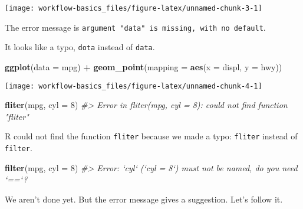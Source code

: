 \documentclass[]{book}
\newenvironment{Shaded}{\begin{snugshade}}{\end{snugshade}}
\newcommand{\CommentTok}[1]{\textcolor[rgb]{0.56,0.35,0.01}{\textit{#1}}}
\newcommand{\DataTypeTok}[1]{\textcolor[rgb]{0.13,0.29,0.53}{#1}}
\newcommand{\DecValTok}[1]{\textcolor[rgb]{0.00,0.00,0.81}{#1}}
\newcommand{\KeywordTok}[1]{\textcolor[rgb]{0.13,0.29,0.53}{\textbf{#1}}}
\newcommand{\NormalTok}[1]{#1}
\newcommand{\OperatorTok}[1]{\textcolor[rgb]{0.81,0.36,0.00}{\textbf{#1}}}
\newcommand{\StringTok}[1]{\textcolor[rgb]{0.31,0.60,0.02}{#1}}
\theoremstyle{plain}
\theoremstyle{remark}
\theoremstyle{definition}
\theoremstyle{definition}
\theoremstyle{definition}
\theoremstyle{remark}
\begin{document}
\begin{center}\texttt{[image: workflow-basics\_files/figure-latex/unnamed-chunk-3-1]} \end{center}

The error message is
\texttt{argument\ "data"\ is\ missing,\ with\ no\ default}.

It looks like a typo, \texttt{dota} instead of \texttt{data}.

\begin{Shaded}
\begin{Highlighting}[]
\KeywordTok{ggplot}\NormalTok{(}\DataTypeTok{data =}\NormalTok{ mpg) }\OperatorTok{+}
\StringTok{  }\KeywordTok{geom_point}\NormalTok{(}\DataTypeTok{mapping =} \KeywordTok{aes}\NormalTok{(}\DataTypeTok{x =}\NormalTok{ displ, }\DataTypeTok{y =}\NormalTok{ hwy))}
\end{Highlighting}
\end{Shaded}

\begin{center}\texttt{[image: workflow-basics\_files/figure-latex/unnamed-chunk-4-1]} \end{center}

\begin{Shaded}
\begin{Highlighting}[]
\KeywordTok{fliter}\NormalTok{(mpg, }\DataTypeTok{cyl =} \DecValTok{8}\NormalTok{)}
\CommentTok{#> Error in fliter(mpg, cyl = 8): could not find function "fliter"}
\end{Highlighting}
\end{Shaded}

R could not find the function \texttt{fliter} because we made a typo:
\texttt{fliter} instead of \texttt{filter}.

\begin{Shaded}
\begin{Highlighting}[]
\KeywordTok{filter}\NormalTok{(mpg, }\DataTypeTok{cyl =} \DecValTok{8}\NormalTok{)}
\CommentTok{#> Error: `cyl` (`cyl = 8`) must not be named, do you need `==`?}
\end{Highlighting}
\end{Shaded}

We aren't done yet. But the error message gives a suggestion. Let's
follow it.
\end{document}

